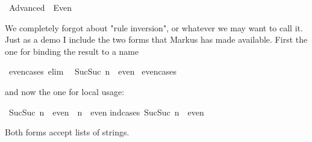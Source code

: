 %
\begin{isabellebody}%
\def\isabellecontext{Advanced}%
\isanewline
{}\ Advanced\ {\isacharequal}\ Even{\isacharcolon}%
\begin{isamarkuptext}%
We completely forgot about "rule inversion", or whatever we may want
to call it. Just as a demo I include the two forms that Markus has made available. First the one for binding the result to a name%
\end{isamarkuptext}%
\ even{\isacharunderscore}cases\ {\isacharbrackleft}elim{\isacharbang}{\isacharbrackright}{\isacharcolon}\isanewline
\ \ {\isachardoublequote}Suc{\isacharparenleft}Suc\ n{\isacharparenright}\ {\isasymin}\ even{\isachardoublequote}\isanewline
\isanewline
{}\ even{\isacharunderscore}cases%
\begin{isamarkuptext}%
and now the one for local usage:%
\end{isamarkuptext}%
\ {\isachardoublequote}Suc{\isacharparenleft}Suc\ n{\isacharparenright}\ {\isasymin}\ even\ {\isasymLongrightarrow}\ n\ {\isasymin}\ even{\isachardoublequote}\isanewline
{}ind{\isacharunderscore}cases\ {\isachardoublequote}Suc{\isacharparenleft}Suc\ n{\isacharparenright}\ {\isasymin}\ even{\isachardoublequote}{\isacharparenright}%
\begin{isamarkuptext}%
Both forms accept lists of strings.


\end{isamarkuptext}
\end{isabellebody}
